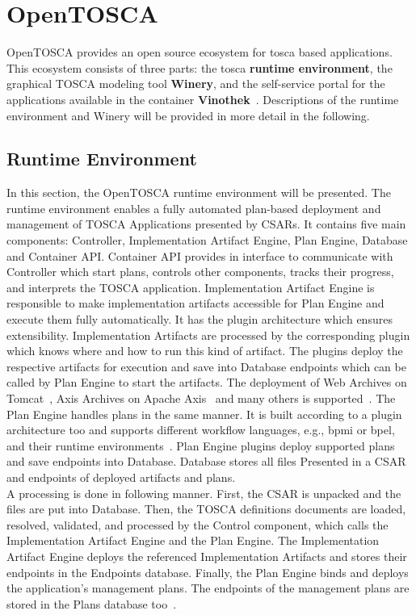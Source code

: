\section{OpenTOSCA} \label{sec:opentosca}
OpenTOSCA provides an open source ecosystem for \gls{tosca} based applications. 
This ecosystem consists of three parts: the \gls{tosca} \textbf{runtime environment}, the graphical TOSCA modeling tool \textbf{Winery}, and the self-service portal for the applications available in the container \textbf{Vinothek}~\cite*{OpenTOSCA}.
Descriptions of the runtime environment and Winery will be provided in more detail in the following. 
\subsection*{Runtime Environment}
In this section, the OpenTOSCA runtime environment will be presented.
The runtime environment enables a fully automated plan-based deployment and management of TOSCA Applications presented by CSARs. 
It contains five main components: Controller, Implementation Artifact Engine, Plan Engine, Database and Container API.
Container API provides in interface to communicate with Controller which  start plans, controls other components, tracks their progress, and interprets the TOSCA application.
Implementation Artifact Engine is responsible to make implementation artifacts accessible for Plan Engine and execute them fully automatically.
It has the plugin architecture which ensures extensibility.
Implementation Artifacts are processed by the corresponding plugin which knows where and how to run this kind of artifact. 
The plugins deploy the respective artifacts for execution and save into Database endpoints which can be called by Plan Engine to start the artifacts.
The deployment of Web Archives on Tomcat~\cite*{tomcat}, Axis Archives on Apache Axis~\cite*{axis} and many others is supported~\cite*{macharb}.
The Plan Engine handles plans in the same manner.
It is built according to a plugin architecture too and supports different workflow languages, e.g., \gls{bpmi} or \gls{bpel}, and their runtime environments~\cite{INPROC-2013-45}.
Plan Engine plugins deploy supported plans and save endpoints into Database.
Database stores all files Presented in a CSAR and endpoints of deployed artifacts and plans.
\\
A processing is done in following manner.  
First, the CSAR is unpacked and the files are put into Database.
Then, the TOSCA definitions documents are loaded, resolved, validated, and processed by the Control component, which calls the Implementation Artifact Engine and the Plan Engine.
The Implementation Artifact Engine deploys the referenced Implementation Artifacts and stores their endpoints in the Endpoints database. 
Finally, the Plan Engine binds and deploys the application’s management plans.
The endpoints of the management plans are stored in the Plans database too~\cite{INPROC-2013-45}.
%
%
